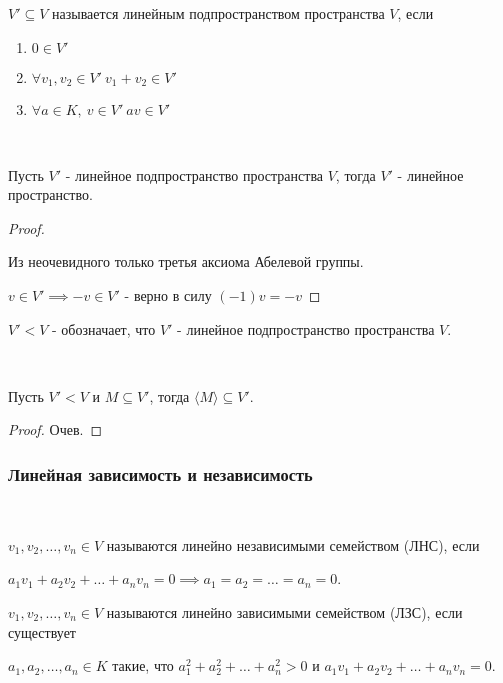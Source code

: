 \begin{defn}
    $V' \subseteq V$ называется линейным подпространством пространства $V$, если
    \begin{enumerate}
        \item $0 \in V'$
        \item $\forall v_1, v_2 \in V'~ v_1 + v_2 \in V'$
        \item $\forall a \in K, ~ v \in V'~ av \in V'$
    \end{enumerate}
\end{defn}

\begin{theorem}~

    Пусть $V'$ - линейное подпространство пространства $V$, тогда $V'$ - линейное пространство.
\end{theorem}

\begin{proof}~

    Из неочевидного только третья аксиома Абелевой группы.

    $v \in V' \implies -v \in V'$ - верно в силу $(-1)v = -v$
\end{proof}

\begin{defn}
    $V' < V$ - обозначает, что $V'$ - линейное подпространство пространства $V$.
\end{defn}

\begin{lemma}~

    Пусть $V' < V$ и $M \subseteq V'$, тогда $\langle M \rangle \subseteq V'$.
\end{lemma}

\begin{proof}
    Очев.
\end{proof}

\subsubsection*{Линейная зависимость и независимость}

\begin{defn}~

    $v_1, v_2, \ldots, v_n \in V$ называются линейно независимыми семейством (ЛНС), если 
    
    $a_1v_1 + a_2v_2 + \ldots + a_nv_n = 0 \implies a_1 = a_2 = \ldots = a_n = 0$.

    $v_1, v_2, \ldots, v_n \in V$ называются линейно зависимыми семейством (ЛЗС), если существует 
    
    $a_1, a_2, \ldots, a_n \in K$ такие, что $a_1^2 + a_2^2 + \ldots + a_n^2 > 0$ и $a_1v_1 + a_2v_2 + \ldots + a_nv_n = 0$.
    
\end{defn}

